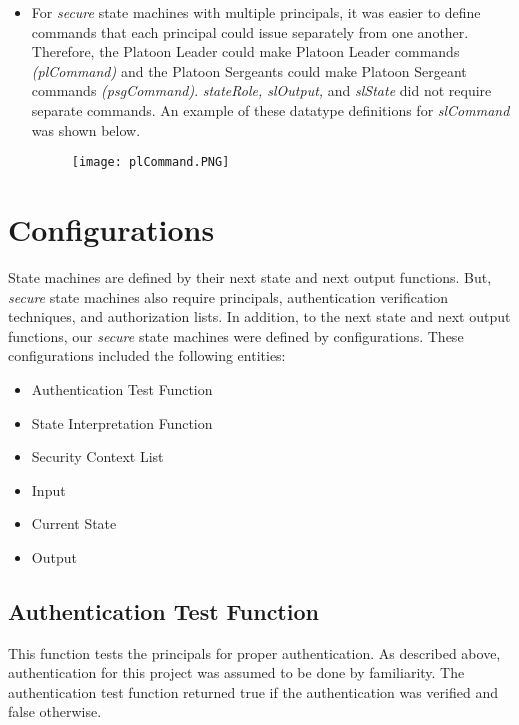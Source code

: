 \begin{itemize}
 \item For \textit{secure} state machines with multiple principals, it was easier to define
  commands that each principal could issue separately from one another.  Therefore, the Platoon
  Leader could make Platoon Leader commands \textit{(plCommand)} and the Platoon Sergeants could
  make Platoon Sergeant commands \textit{(psgCommand)}.  \textit{stateRole, slOutput,} and
  \textit{slState} did not require separate commands.  An example of these datatype definitions
  for \textit{slCommand} was shown below.
  
  \begin{figure}[h]
  \centering
  \texttt{[image: plCommand.PNG]}
\end{figure}

\end{itemize}

\section{Configurations}
\label{sec:configurations}

State machines are defined by their next state and next output functions.  But, \textit{secure} state
machines also require principals, authentication verification techniques, and authorization lists.  In
addition, to the next state and next output functions, our \textit{secure} state machines were defined
by configurations.  These configurations included the following entities:
\begin{itemize}
\item Authentication Test Function
\item State Interpretation Function
\item Security Context List
\item Input
\item Current State
\item Output\\
  \end{itemize}
  
\subsection{Authentication Test Function}
\label{sec:auth-test-funct}

  This function tests the principals for proper authentication.  As described above,
  authentication for this project was assumed to be done by familiarity.  The authentication
  test function returned true if the authentication was verified and false otherwise.
  

